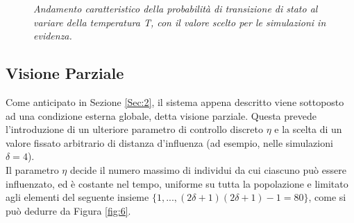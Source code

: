 \documentclass{article}
\begin{document}
\bigskip
\begin{figure}[h]
\centering
{}
\caption{\textit{Andamento caratteristico della probabilità di transizione di stato al variare della temperatura T, con il valore scelto per le simulazioni in evidenza.}}
\label{fig:5}
\end{figure}

\bigskip \bigskip
\subsection{Visione Parziale}
\label{Sec:3.2}

Come anticipato in Sezione \ref{Sec:2}, il sistema appena descritto viene sottoposto ad una condizione esterna globale, detta visione parziale. Questa prevede l'introduzione di un ulteriore parametro di controllo discreto $\eta$ e la scelta di un valore fissato arbitrario di distanza d'influenza (ad esempio, nelle simulazioni $\delta=4$).
\\ Il parametro $\eta$ decide il numero massimo di individui da cui ciascuno può essere influenzato, ed è costante nel tempo, uniforme su tutta la popolazione e limitato agli elementi del seguente insieme $\{ 1, ..., (2\delta+1)(2\delta+1)-1=80\}$, come si può dedurre da Figura \ref{fig:6}.
\end{document}
